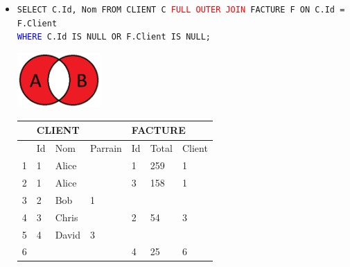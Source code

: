 \documentclass[a4paper]{article}
\begin{document}
\begin{itemize}
\begin{itemize}
    \item \texttt{SELECT C.Id, Nom FROM CLIENT C \textcolor{red}{FULL OUTER JOIN} FACTURE F ON C.Id = F.Client} \\ \texttt{\textcolor{blue}{WHERE} C.Id IS NULL OR F.Client IS NULL;}
    \begin{center}
        \includegraphics[width=0.25\textwidth]{../images/full-outer-join-02.PNG}
    \end{center}
    \begin{center}
        \begin{tabular}{|l|l|l|l|l|l|l|} \hline
            & \multicolumn{3}{l|}{CLIENT} & \multicolumn{3}{l|}{FACTURE} \\ \hline
            & Id & Nom & Parrain & Id & Total & Client \\ \hline
            1 & 1 & Alice &   & 1 & 259 & 1 \\ \hline
            2 & 1 & Alice &   & 3 & 158 & 1 \\ \hline
            \rowcolor{orange!30}
            3 & 2 &   Bob & 1 &   &     &   \\ \hline
            4 & 3 & Chris &   & 2 &  54 & 3 \\ \hline
            \rowcolor{orange!30}
            5 & 4 & David & 3 &   &     &   \\ \hline
            \rowcolor{orange!30}
            6 &   &       &   & 4 &  25 & 6 \\ \hline
        \end{tabular}
    \end{center}



\end{itemize}
\end{itemize}
\end{document}
